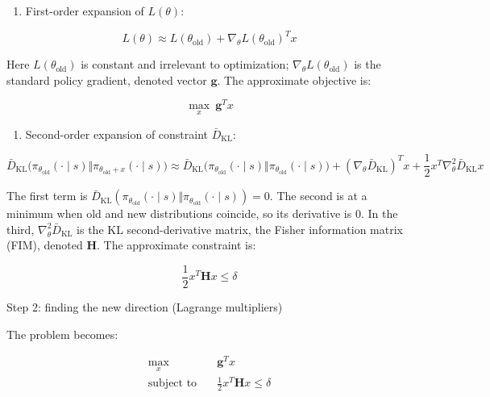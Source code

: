 \begin{enumerate}
\def\labelenumi{\arabic{enumi}.}
\tightlist
\item
{}
  First-order expansion of \(L(\theta)\):
\end{enumerate}

\[
L(\theta)\approx
L(\theta_{\mathrm{old}})
+
\nabla_\theta L(\theta_{\mathrm{old}})^{T}x
\]

Here \(L(\theta_{\mathrm{old}})\) is constant and irrelevant to optimization; \(\nabla_\theta L(\theta_{\mathrm{old}})\) is the standard policy gradient, denoted vector \(\mathbf{g}\). The approximate objective is:

\[
\max_x\ \mathbf{g}^{T}x
\]

\begin{enumerate}
\def\labelenumi{\arabic{enumi}.}
\setcounter{enumi}{1}
\tightlist
\item
{}
  Second-order expansion of constraint \(\bar{D}_{\mathrm{KL}}\):
\end{enumerate}

\[
\bar{D}_{\mathrm{KL}}\bigl(
\pi_{\theta_{\mathrm{old}}}(\cdot\mid s)
\Vert
\pi_{\theta_{\mathrm{old}}+x}(\cdot\mid s)
\bigr)
\approx
\bar{D}_{\mathrm{KL}}\bigl(
\pi_{\theta_{\mathrm{old}}}(\cdot\mid s)
\Vert
\pi_{\theta_{\mathrm{old}}}(\cdot\mid s)
\bigr)
+
(\nabla_\theta \bar{D}_{\mathrm{KL}})^{T} x
+
\frac{1}{2}x^{T}\nabla_\theta^{2}\bar{D}_{\mathrm{KL}}x
\]

The first term is \(\bar{D}_{\mathrm{KL}}(\pi_{\theta_{\mathrm{old}}}(\cdot\mid s)\Vert\pi_{\theta_{\mathrm{old}}}(\cdot\mid s))=0\). The second is at a minimum when old and new distributions coincide, so its derivative is \(0\). In the third, \(\nabla_\theta^{2}\bar{D}_{\mathrm{KL}}\) is the KL second-derivative matrix, the Fisher information matrix (FIM), denoted \(\mathbf{H}\). The approximate constraint is:

\[
\frac{1}{2}x^{T}\mathbf{H}x\le \delta
\]

Step 2: finding the new direction (Lagrange multipliers)

The problem becomes:

\[
\begin{aligned}
\max_x\quad
& \mathbf{g}^{T}x \\
\text{subject to}\quad
& \frac{1}{2}x^{T}\mathbf{H}x\le \delta
\end{aligned}
\]

